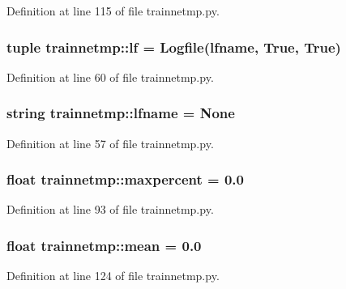 Definition at line 115 of file trainnetmp.py.

\hypertarget{namespacetrainnetmp_ac6c0cf0d61312a5dbd34443a74310689}{
\subsubsection[{lf}]{\setlength{\rightskip}{0pt plus 5cm}tuple {\bf trainnetmp::lf} = Logfile({\bf lfname}, True, True)}}
\label{namespacetrainnetmp_ac6c0cf0d61312a5dbd34443a74310689}


Definition at line 60 of file trainnetmp.py.

\hypertarget{namespacetrainnetmp_a9ebecee08a7b0aefef2e0b192e970bda}{
\subsubsection[{lfname}]{\setlength{\rightskip}{0pt plus 5cm}string {\bf trainnetmp::lfname} = None}}
\label{namespacetrainnetmp_a9ebecee08a7b0aefef2e0b192e970bda}


Definition at line 57 of file trainnetmp.py.

\hypertarget{namespacetrainnetmp_ae484804d6f3c2525ab89fc23b715d8d0}{
\subsubsection[{maxpercent}]{\setlength{\rightskip}{0pt plus 5cm}float {\bf trainnetmp::maxpercent} = 0.0}}
\label{namespacetrainnetmp_ae484804d6f3c2525ab89fc23b715d8d0}


Definition at line 93 of file trainnetmp.py.

\hypertarget{namespacetrainnetmp_a8647e1123b531e4df1080e929f352389}{
\subsubsection[{mean}]{\setlength{\rightskip}{0pt plus 5cm}float {\bf trainnetmp::mean} = 0.0}}
\label{namespacetrainnetmp_a8647e1123b531e4df1080e929f352389}


Definition at line 124 of file trainnetmp.py.

